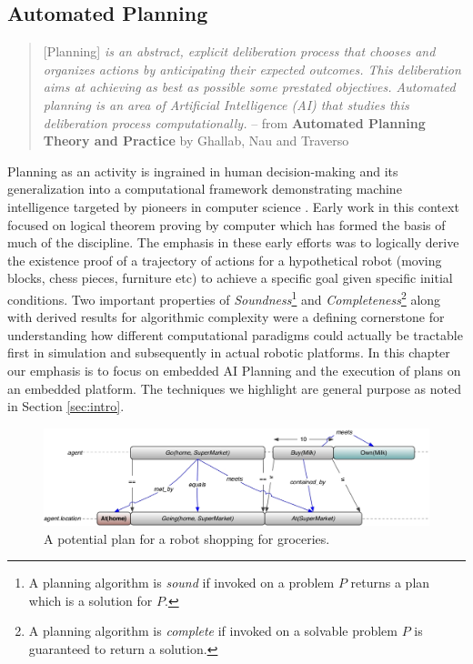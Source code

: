 \subsection{Automated Planning}
\label{sec:planningfound}

{\scriptsize
  \begin{quote} [Planning] \emph{is an abstract, explicit deliberation
      process that chooses and organizes actions by anticipating their
      expected outcomes. This deliberation aims at achieving as best
      as possible some prestated objectives. Automated planning is an
      area of Artificial Intelligence (AI) that studies this
      deliberation process computationally.} -- from \textbf{Automated
      Planning Theory and Practice} by Ghallab, Nau and Traverso
    \cite{ghallab04}
\end{quote}
}

Planning as an activity is ingrained in human decision-making
\cite{berthoz} and its generalization into a computational framework
demonstrating machine intelligence 
targeted by pioneers in computer science
\cite{computersthought}. Early work in this context focused on logical
theorem proving by computer \cite{green69} which has formed the basis
of much of the discipline. The emphasis in these early efforts was to
logically derive the existence proof of a trajectory of actions for a
hypothetical robot (moving blocks, chess pieces, furniture etc) to
achieve a specific goal given specific initial conditions. Two
important properties of \emph{Soundness}\footnote{A planning algorithm
  is \emph{sound} if invoked on a problem $P$ returns a plan which is
  a solution for $P$.} and \emph{Completeness}\footnote{A planning
  algorithm is \emph{complete} if invoked on a solvable problem $P$ is
  guaranteed to return a solution.} along with derived results for
algorithmic complexity \cite{gareyjohnson,corman} were a defining
cornerstone for understanding how different computational paradigms
could actually be tractable first in simulation and subsequently in
actual robotic platforms. In this chapter our emphasis is to focus on
embedded AI Planning and the execution of plans on an embedded
 platform. The techniques we highlight are
general purpose as noted in Section \ref{sec:intro}.

\begin{figure}[b]
\centering
  \includegraphics[scale=3]{figs/shopping_europa.jpeg}
  \caption{\small A potential plan for a robot shopping for groceries.}
\label{fig:shop:shopping}
\end{figure}

